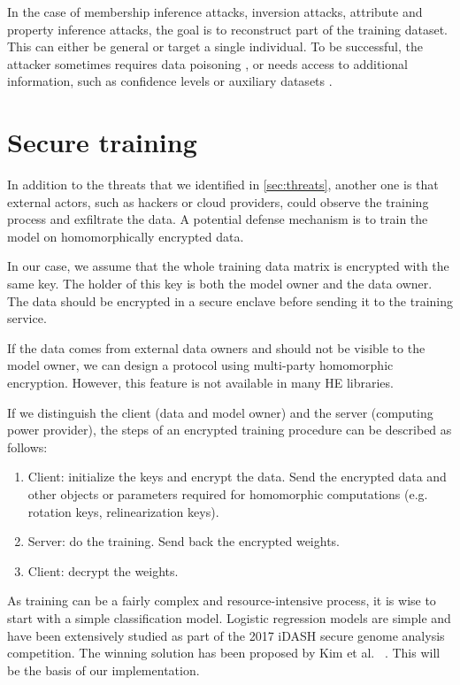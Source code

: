 \documentclass[a4paper,11pt,oneside]{report}
\begin{document}
In the case of membership inference attacks, inversion attacks, attribute and property inference attacks, the goal is to reconstruct part of the training dataset. 
This can either be general or target a single individual. To be successful, the attacker sometimes requires data poisoning \cite{hidano_model_2017}, or needs access to additional information, such as confidence levels or auxiliary datasets \cite{fredrikson_model_2015, wang_variational_2022}.


\section{Secure training}\label{sec:secure_training}

In addition to the threats that we identified in \autoref{sec:threats}, another one is that external actors, such as hackers or cloud providers, could observe the training process and exfiltrate the data. 
A potential defense mechanism is to train the model on homomorphically encrypted data.

In our case, we assume that the whole training data matrix is encrypted with the same key. 
The holder of this key is both the model owner and the data owner. 
The data should be encrypted in a secure enclave before sending it to the training service. 

If the data comes from external data owners and should not be visible to the model owner, we can design a protocol using multi-party homomorphic encryption. 
However, this feature is not available in many HE libraries.

If we distinguish the client (data and model owner) and the server (computing power provider), the steps of an encrypted training procedure can be described as follows:
\begin{enumerate}
    \item Client: initialize the keys and encrypt the data. Send the encrypted data and other objects or parameters required for homomorphic computations (e.g. rotation keys, relinearization keys).
    \item Server: do the training. Send back the encrypted weights.
    \item Client: decrypt the weights.
\end{enumerate}

As training can be a fairly complex and resource-intensive process, it is wise to start with a simple classification model. 
Logistic regression models are simple and have been extensively studied as part of the 2017 iDASH secure genome analysis competition. 
The winning solution has been proposed by Kim et al. ~\cite{kim_logistic_2018}. 
This will be the basis of our implementation.
\end{document}
